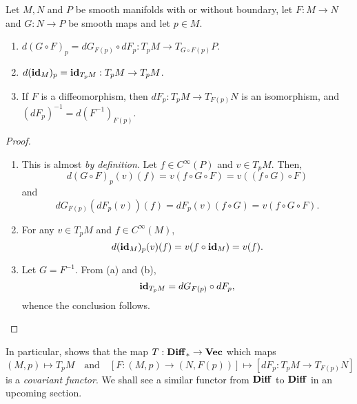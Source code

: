 \begin{proposition}
    Let $M,N$ and $P$ be smooth manifolds with or without boundary, let $F:M\to N$ and $G:N\to P$ be smooth maps and let $p\in M$.
    \begin{enumerate}[label=(\alph*)]
        \item $d(G\circ F)_p = dG_{F(p)}\circ dF_p: T_pM\to T_{G\circ F(p)}P$.
        \item $d(\mathbf{id}_M)_p = \mathbf{id}_{T_pM}: T_pM\to T_pM$.
        \item If $F$ is a diffeomorphism, then $dF_p: T_pM\to T_{F(p)}N$ is an isomorphism, and $(dF_p)^{-1} = d(F^{-1})_{F(p)}$.
    \end{enumerate}
\end{proposition}
\begin{proof}
\begin{enumerate}[label=(\alph*)]
    \item This is almost \emph{by definition}. Let $f\in C^\infty(P)$ and $v\in T_pM$. Then, 
    \begin{equation*}
        d(G\circ F)_p(v)(f) = v(f\circ G\circ F) = v((f\circ G)\circ F)
    \end{equation*}
    and 
    \begin{equation*}
        dG_{F(p)}(dF_p(v))(f) = dF_p(v)(f\circ G) = v(f\circ G\circ F).
    \end{equation*}

    \item For any $v\in T_pM$ and $f\in C^\infty(M)$, 
    \begin{equation*}
        d(\mathbf{id}_M)_p(v)(f) = v(f\circ\mathbf{id}_M) = v(f).
    \end{equation*}

    \item Let $G = F^{-1}$. From (a) and (b), 
    \begin{equation*}
        \mathbf{id}_{T_pM} = dG_{F(p)}\circ dF_p,
    \end{equation*}
    whence the conclusion follows.\qedhere
\end{enumerate}
\end{proof}

\begin{mdframed}
    In particular,  shows that the map $T: \mathbf{Diff}_*\to\mathbf{Vec}$ which maps 
    \begin{equation*}
        (M,p)\mapsto T_pM\quad\text{and}\quad \left[F: (M, p)\to (N, F(p))\right]\mapsto\left[dF_p: T_pM\to T_{F(p)}N\right]
    \end{equation*}
    is a \emph{covariant functor}. We shall see a similar functor from $\mathbf{Diff}$ to $\mathbf{Diff}$ in an upcoming section.
\end{mdframed}


